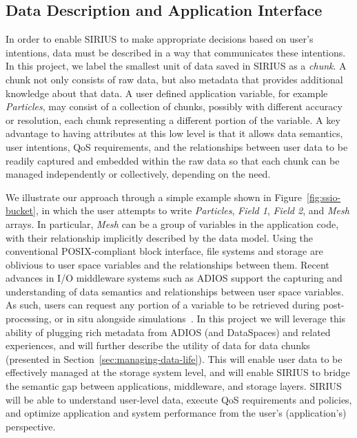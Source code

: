 \subsection{Data Description and Application Interface}
\label{sec:data-description}
In order to enable SIRIUS to make appropriate decisions based on user's intentions, data must be
described in a way that communicates these intentions.
 In this project, we label the smallest unit of data
saved in  SIRIUS as a \textit{chunk}.  A chunk not only consists of 
raw data, but also metadata that provides additional
knowledge about that data.
A user defined application variable, for example \textit{Particles}, may
consist of a collection of chunks, possibly with different accuracy or
resolution, each chunk representing a different portion of the variable.
A key advantage to having attributes at this low level is that it allows data
semantics, user intentions, QoS requirements, and the relationships between user
data to be readily captured and embedded within the raw data so that each chunk
can be managed independently or collectively, depending on the need.

  We illustrate our approach through a simple example shown in Figure~\ref{fig:ssio-bucket},
  in which the user attempts to write \textit{Particles}, \textit{Field 1},
  \textit{Field 2}, and \textit{Mesh} arrays. In particular, \textit{Mesh} can be a group
  of variables in the application code, with their relationship implicitly described
  by the data model. Using the conventional POSIX-compliant block interface, file
  systems and storage are oblivious to user space variables and the relationships between
  them. Recent advances in I/O middleware systems such as ADIOS \cite{liu_helloadios}
  support the capturing and understanding of data semantics and relationships between  
  user space variables. As such, users can request any portion of a variable to be retrieved
  during post-processing, or in situ alongside simulations~\cite{docan2012dataspaces}. 
  In this project we will leverage this ability of plugging rich metadata from ADIOS (and 
  DataSpaces) and related experiences, and will further describe the utility of data for data 
  chunks (presented in Section~\ref{sec:managing-data-life}). This will enable user data to 
  be effectively managed at the storage system level, and will enable SIRIUS
%  
%   
to bridge the semantic gap between applications, middleware, and storage
layers. SIRIUS will be able to understand user-level data, execute QoS requirements and policies, and optimize 
application and system performance from the user's (application's) perspective.

